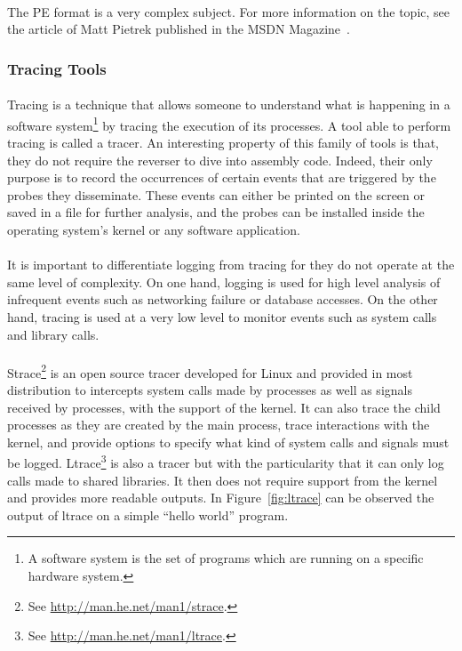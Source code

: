 \paragraph{}
The PE format is a very complex subject. For more information on the topic, see the article of Matt Pietrek published in the MSDN Magazine~\cite{pietrek2002inside}.


\subsubsection{Tracing Tools}
\paragraph{}
Tracing is a technique that allows someone to understand what is happening in a software system\footnote{A software system is the set of programs which are running on a specific hardware system.} by tracing the execution of its processes. A tool able to perform tracing is called a tracer. An interesting property of this family of tools is that, they do not require the reverser to dive into assembly code. Indeed, their only purpose is to record the occurrences of certain events that are triggered by the probes they disseminate. These events can either be printed on the screen or saved in a file for further analysis, and the probes can be installed inside the operating system's kernel or any software application.

\paragraph{}
It is important to differentiate logging from tracing for they do not operate at the same level of complexity. On one hand, logging is used for high level analysis of infrequent events such as networking failure or database accesses. On the other hand, tracing is used at a very low level to monitor events such as system calls and library calls.

\paragraph{}
Strace\footnote{See \url{http://man.he.net/man1/strace}.} is an open source tracer developed for Linux and provided in most distribution to intercepts system calls made by processes as well as signals received by processes, with the support of the kernel. It can also trace the child processes as they are created by the main process, trace interactions with the kernel, and provide options to specify what kind of system calls and signals must be logged. Ltrace\footnote{See \url{http://man.he.net/man1/ltrace}.} is also a tracer but with the particularity that it can only log calls made to shared libraries. It then does not require support from the kernel and provides more readable outputs. In Figure~\ref{fig:ltrace} can be observed the output of ltrace on a simple “hello world” program.


